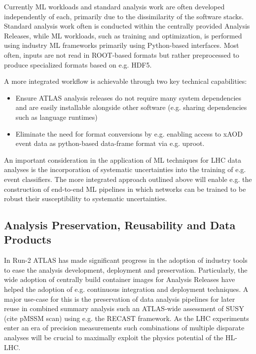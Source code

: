 Currently ML workloads and standard analysis work are often developed independently of each, primarily due to the dissimilarity of the software stacks. Standard analysis work often is conducted within the centrally provided Analysis Releases, while ML workloads, such as training and optimization, is performed using industry ML frameworks primarily using Python-based interfaces. Most often, inputs are not read in ROOT-based formats but rather preprocessed to produce specialized formats based on e.g. HDF5.

A more integrated workflow is achievable through two key technical capabilities:

\begin{itemize}
    \item Ensure ATLAS analysis releases do not require many system dependencies and are easily installable alongside other software (e.g. sharing dependencies such as language runtimes)
    \item Eliminate the need for format conversions by e.g. enabling access to xAOD event data as python-based data-frame format via e.g. uproot.
\end{itemize}

An important consideration in the application of ML techniques for LHC data analyses is the incorporation of systematic uncertainties into the training of e.g. event classifiers. The more integrated approach outlined above will enable e.g. the construction of end-to-end ML pipelines in which networks can be trained to be robust their susceptibility to systematic uncertainties.

\subsection{Analysis Preservation, Reusability and Data Products}

In Run-2 ATLAS has made significant progress in the adoption of industry tools to ease the analysis development, deployment and preservation. Particularly, the wide adoption of centrally build container images for Analysis Releases have helped the adoption of e.g. continuous integration and deployment techniques. A major use-case for this is the preservation of data analysis pipelines for later reuse in combined summary analysis such an ATLAS-wide assessment of SUSY (cite pMSSM scan) using e.g. the {\sc RECAST} framework. As the LHC experiments enter an era of precision measurements such combinations of multiple disparate analyses will be crucial to maximally exploit the physics potential of the HL-LHC.

